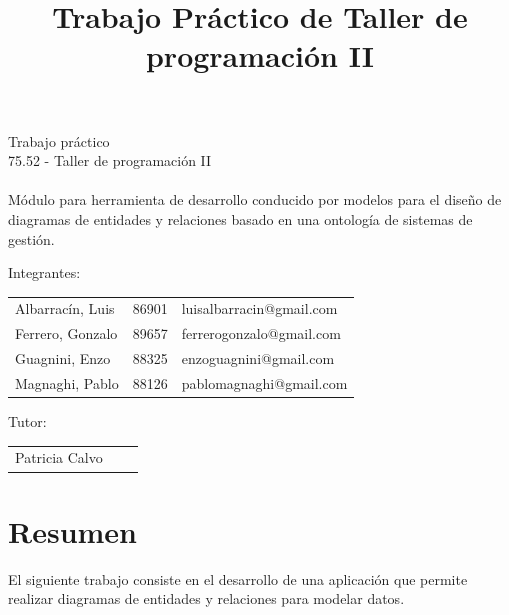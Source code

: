 \documentclass[11pt]{article}
\title{Trabajo Práctico de Taller de programación II}
\begin{document}

\begin{titlepage}
\thispagestyle{empty}


\begin{center}
  \vspace{.5cm}
  \Large{Trabajo práctico}\\
  \vspace{.5cm}
  \Large{75.52 - Taller de programación II}\\
  \hrulefill \\
  \vspace{2cm}
  \large{Módulo para herramienta de desarrollo conducido por modelos para el diseño de diagramas de entidades 
    y relaciones basado en una ontología de sistemas de gestión.}
\end{center}

\vfill

Integrantes: \ \ \ 
\begin{tabular}{ | l l l }
Albarracín, Luis & 86901 & luisalbarracin@gmail.com  \\
Ferrero, Gonzalo & 89657 & ferrerogonzalo@gmail.com \\
Guagnini, Enzo & 88325 & enzoguagnini@gmail.com \\
Magnaghi, Pablo & 88126 & pablomagnaghi@gmail.com 
\end{tabular}

\vspace{.3cm}

Tutor: \ \ \ \ \ \ \ \ \ \
\begin{tabular}{ | l l l }
Patricia Calvo
\end{tabular}

\vspace{.5cm}


\end{titlepage}


\newpage
\setcounter{tocdepth}{4}
\tableofcontents
\newpage


\section{Resumen}
  El siguiente trabajo consiste en el desarrollo de una aplicación que permite realizar diagramas de entidades y relaciones para modelar datos.
  
\end{document}
